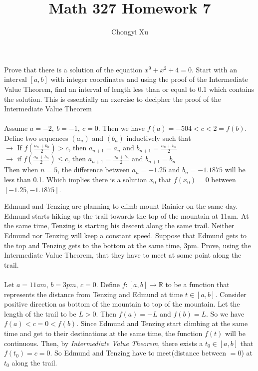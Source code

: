 \documentclass[]{exam}
\title{}
\title{Math 327 Homework 7}
\author{Chongyi Xu}
\begin{document}
	
\maketitle
\begin{questions}
\question Prove that there is a solution of the equation $x^9 + x^2 + 4 = 0$. Start with an interval $[a, b]$ with integer coordinates and using the proof of the Intermediate Value Theorem, find an interval of length less than or equal to 0.1 which contains the solution. This is essentially an exercise to decipher the proof of the Intermediate Value Theorem
\\
\\ Assume $a = -2,\ b = -1,\ c = 0$. Then we have $f(a) = -504 < c < 2 = f(b)$. Define two sequences $(a_n)$ and $(b_n)$ inductively such that
\\ $\rightarrow$ If $f(\frac{a_n + b_n}{2}) > c$, then $a_{n + 1} = a_n$ and $b_{n + 1} = \frac{a_n + b_n}{2}$
\\ $\rightarrow$ if $f(\frac{a_n + b_n}{2}) \leq c$, then $a_{n + 1} = \frac{a_n + b_n}{2}$ and $b_{n + 1} = b_n$
\\ Then when $n = 5$, the difference between $a_n = -1.25$ and $b_n = -1.1875$ will be less than 0.1. Which implies there is a solution $x_0$ that $f(x_0) = 0$ between $[-1.25, -1.1875]$.

\question Edmund and Tenzing are planning to climb mount Rainier on the same day. Edmund starts hiking up the trail towards the top of the mountain at 11am. At the same time, Tenzing is starting his descent along the same trail. Neither Edmund nor Tenzing will keep a constant speed. Suppose that Edmund gets to the top and Tenzing gets to the bottom at the same time, 3pm. Prove, using the Intermediate Value Theorem, that they have to meet at some point along the trail.
\\
\\ Let $a = 11am$, $b = 3pm$, $c = 0$. Define $f:[a, b] \rightarrow \mathbb{R}$ to be a function that represents the distance from Tenzing and Edmund at time $t\in[a, b]$. Consider positive direction as bottom of the mountain to top of the mountain. Let the length of the trail to be $L > 0$. Then $f(a) = -L$ and $f(b) = L$. So we have $f(a) < c = 0 < f(b)$. Since Edmund and Tenzing start climbing at the same time and get to their destinations at the same time, the function $f(t)$ will be continuous. Then, by \textit{Intermediate Value Theorem}, there exists a $t_0\in[a, b]$ that $f(t_0) = c = 0$. So Edmund and Tenzing have to meet(distance between $= 0$) at $t_0$ along the trail.


\end{questions}
\end{document}
